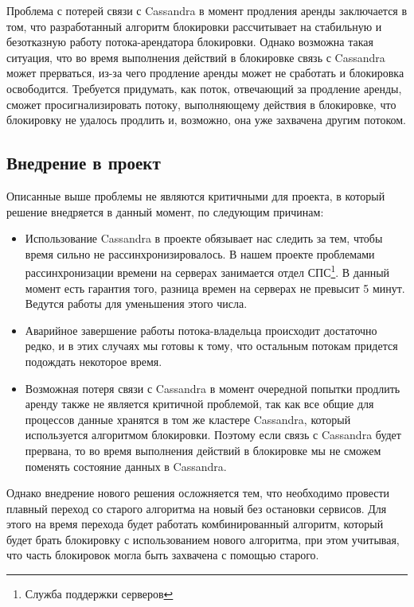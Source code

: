 Проблема с потерей связи с Cassandra в момент продления аренды заключается в том, что разработанный алгоритм блокировки рассчитывает на стабильную и безотказную работу потока-арендатора блокировки. Однако возможна такая ситуация, что во время выполнения действий в блокировке связь с Cassandra может прерваться, из-за чего продление аренды может не сработать и блокировка освободится. Требуется придумать, как поток, отвечающий за продление аренды, сможет просигнализировать потоку, выполняющему действия в блокировке, что блокировку не удалось продлить и, возможно, она уже захвачена другим потоком.

\subsection{Внедрение в проект}

Описанные выше проблемы не являются критичными для проекта, в который решение внедряется в данный момент, по следующим причинам: 

\begin{itemize}
	\item Использование Cassandra в проекте обязывает нас следить за тем, чтобы время сильно не рассинхронизировалось. В нашем проекте проблемами рассинхронизации времени на серверах занимается отдел СПС\footnote{Служба поддержки серверов}. В данный момент есть гарантия того, разница времен на серверах не превысит 5 минут. Ведутся работы для уменьшения этого числа.

	\item Аварийное завершение работы потока-владельца происходит достаточно редко, и в этих случаях мы готовы к тому, что остальным потокам придется подождать некоторое время.

	\item Возможная потеря связи с Cassandra в момент очередной попытки продлить аренду также не является критичной проблемой, так как все общие для процессов данные хранятся в том же кластере Cassandra, который используется алгоритмом блокировки. Поэтому если связь с Cassandra будет прервана, то во время выполнения действий в блокировке мы не сможем поменять состояние данных в Cassandra. 
\end{itemize}

Однако внедрение нового решения осложняется тем, что необходимо провести плавный переход со старого алгоритма на новый без остановки сервисов. Для этого на время перехода будет работать комбинированный алгоритм, который будет брать блокировку с использованием нового алгоритма, при этом учитывая, что часть блокировок могла быть захвачена с помощью старого.
